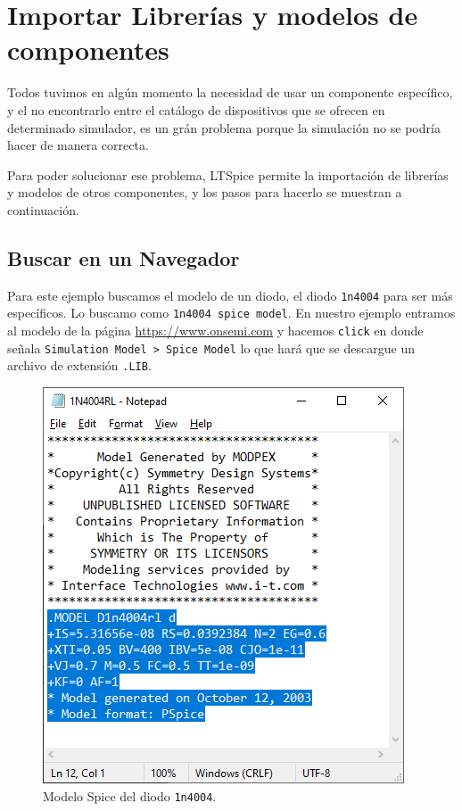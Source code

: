 \documentclass[a4paper]{article} %
\begin{document}
\section{Importar Librerías y modelos de componentes}

Todos tuvimos en algún momento la necesidad de usar un componente específico, y el no encontrarlo entre el catálogo de dispositivos que se ofrecen en determinado simulador, es un grán problema porque la simulación no se podría hacer de manera correcta. 

Para poder solucionar ese problema, LTSpice permite la importación de librerías y modelos de otros componentes, y los pasos para hacerlo se muestran a continuación.

\subsection{Buscar en un Navegador}

Para este ejemplo buscamos el modelo de un diodo, el diodo \texttt{1n4004} para ser más específicos. Lo buscamo como \texttt{1n4004 spice model}. En nuestro ejemplo entramos al modelo de la página \url{https://www.onsemi.com} y hacemos \texttt{click} en donde señala \texttt{Simulation Model > Spice Model} lo que hará que se descargue un archivo de extensión \texttt{.LIB}. 

\begin{figure} %
	\centering %
	\includegraphics[scale=0.4]{IMAGENES/img15} %
	\caption{Modelo Spice del diodo \texttt{1n4004}.} %
	\label{img15} %
\end{figure} %
\end{document}
